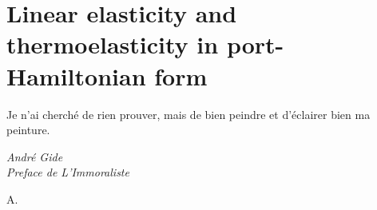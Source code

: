 \chapter[The TITOP approach]{Linear elasticity and thermoelasticity in port-Hamiltonian form}
\label{chap:first_chapter}


\epigraph{Je n’ai cherché de rien prouver, mais de bien peindre et d’éclairer bien ma peinture.}{\textit{André Gide \\ Preface de L’Immoraliste}}

\minitoc


\lettrine{\color{theme}A}{}.
